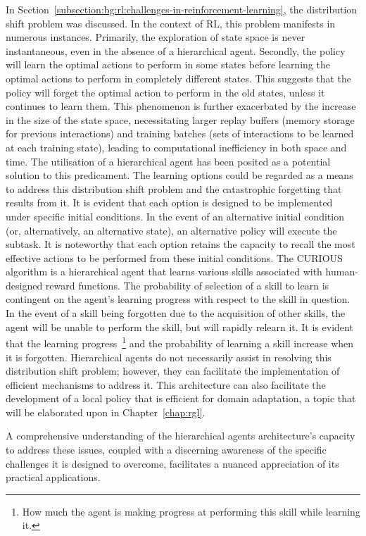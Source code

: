 In Section~\ref{subsection:bg:rl:challenges-in-reinforcement-learning}, the distribution shift problem was discussed.
In the context of RL, this problem manifests in numerous instances.
Primarily, the exploration of state space is never instantaneous, even in the absence of a hierarchical agent.
Secondly, the policy will learn the optimal actions to perform in some states before learning the optimal actions to
perform in completely different states.
This suggests that the policy will forget the optimal action to perform in the old states, unless it continues to learn
them.
This phenomenon is further exacerbated by the increase in the size of the state space, necessitating larger replay
buffers (memory storage for previous interactions) and training batches (sets of interactions to be learned at each
training state), leading to computational inefficiency in both space and time.
The utilisation of a hierarchical agent has been posited as a potential solution to this predicament.
The learning options could be regarded as a means to address this distribution shift problem and the catastrophic
forgetting that results from it.
It is evident that each option is designed to be implemented under specific initial conditions.
In the event of an alternative initial condition (or, alternatively, an alternative state), an alternative policy will
execute the subtask.
It is noteworthy that each option retains the capacity to recall the most effective actions to be performed from these
initial conditions.
The CURIOUS~\citep{colas2019curious} algorithm is a hierarchical agent that learns various skills associated with
human-designed reward functions.
The probability of selection of a skill to learn is contingent on the agent's learning progress with respect to the
skill in question.
In the event of a skill being forgotten due to the acquisition of other skills, the agent will be unable to perform the
skill, but will rapidly relearn it.
It is evident that the learning
progress~\footnote{How much the agent is making progress at performing this skill while learning it.} and the
probability of learning a skill increase when it is forgotten.
Hierarchical agents do not necessarily assist in resolving this distribution shift problem; however, they can
facilitate the implementation of efficient mechanisms to address it.
This architecture can also facilitate the development of a local policy that is efficient for domain adaptation, a
topic that will be elaborated upon in Chapter~\ref{chap:rgl}.

A comprehensive understanding of the hierarchical agents architecture's capacity to address these issues, coupled with
a discerning awareness of the specific challenges it is designed to overcome, facilitates a nuanced appreciation of its
practical applications.
